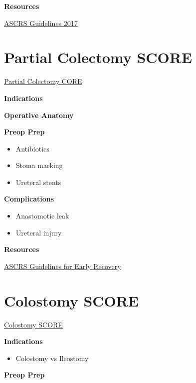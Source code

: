 \documentclass[
]{book}
\providecommand{\tightlist}{%
  \setlength{\itemsep}{0pt}\setlength{\parskip}{0pt}}
\begin{document}
\textbf{Resources}

\href{https://fascrs.org/ascrs/media/files/downloads/Clinical\%20Practice\%20Guidelines/cpg_for_the_surgical_treatment_of_patients_with_lynch_syndrome_feb_2017_dcr_issue.pdf}{ASCRS Guidelines 2017}

\hypertarget{PColectomyObj}{%
\chapter{Partial Colectomy SCORE}\label{PColectomyObj}}

\href{https://www.surgicalcore.org/modulecontent.aspx?id=129670}{Partial Colectomy CORE}

\textbf{Indications}

\textbf{Operative Anatomy}

\textbf{Preop Prep}

\begin{itemize}
\tightlist
\item
  Antibiotics
\item
  Stoma marking
\item
  Ureteral stents
\end{itemize}

\textbf{Complications}

\begin{itemize}
\tightlist
\item
  Anastomotic leak
\item
  Ureteral injury
\end{itemize}

\textbf{Resources}

\href{https://fascrs.org/ascrs/media/files/downloads/Clinical\%20Practice\%20Guidelines/clinical_practice_guidelines_for_enhanced_recovery-3.pdf}{ASCRS Guidelines for Early Recovery}

\hypertarget{ColostomyObj}{%
\chapter{Colostomy SCORE}\label{ColostomyObj}}

\href{https://www.surgicalcore.org/modulecontent.aspx?id=1000457}{Colostomy SCORE}

\textbf{Indications}

\begin{itemize}
\tightlist
\item
  Colostomy vs Ileostomy
\end{itemize}

\textbf{Preop Prep}
\end{document}
